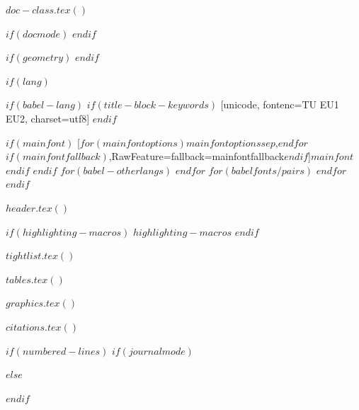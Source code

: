 $doc-class.tex()$
\usepackage{amsmath}
\usepackage{amssymb}
\usepackage{setspace}
$if(docmode)$
\geometry{inner=1in, outer=1in}
\fancyhfoffset[LE,RO]{0cm}
$endif$

$if(geometry)$
\geometry{$for(geometry)$$geometry$$sep$,$endfor$}
\fancyhfoffset[LE,RO]{0cm}
$endif$

$if(lang)$
\usepackage[bidi=default]{babel}
$if(babel-lang)$
$if(title-block-keywords)$
 [unicode, fontenc=TU EU1 EU2, charset=utf8] 
\EndBabelCommands
$endif$


$if(mainfont)$
[$for(mainfontoptions)$$mainfontoptions$$sep$,$endfor$$if(mainfontfallback)$,RawFeature={fallback=mainfontfallback}$endif$]{$mainfont$}
$endif$
$endif$
$for(babel-otherlangs)$
$endfor$
$for(babelfonts/pairs)$
$endfor$
\let\LanguageShortHands\languageshorthands
\def\languageshorthands#1{}
$endif$

\RequirePackage{longtable}
\RequirePackage{threeparttablex}

%
\usepackage{needspace}

\usepackage{framed}


$header.tex()$

$if(highlighting-macros)$
$highlighting-macros$
$endif$

$tightlist.tex()$

$tables.tex()$

$graphics.tex()$


$citations.tex()$


$if(numbered-lines)$
$if(journalmode)$
\usepackage[nolongtablepatch]{lineno}
\setlength\linenumbersep{5pt}
\setlength\columnsep{25pt}
$else$
\usepackage[nolongtablepatch]{lineno}
$endif$

